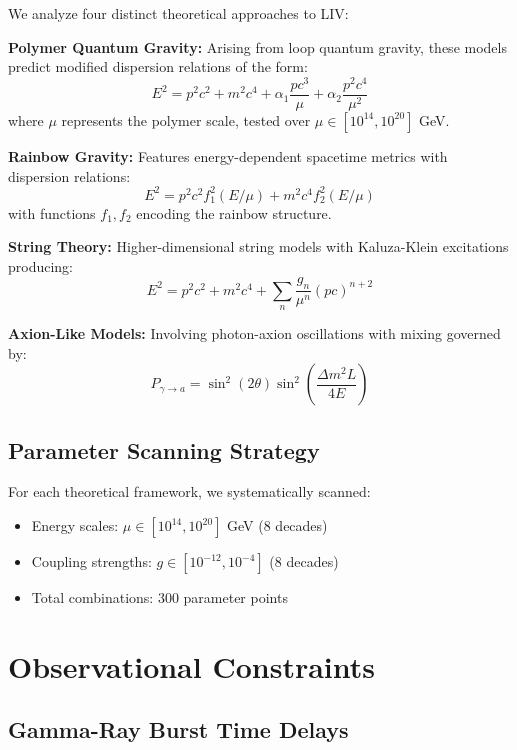 \documentclass[12pt]{article}
\begin{document}
We analyze four distinct theoretical approaches to LIV:

\textbf{Polymer Quantum Gravity:} 
Arising from loop quantum gravity, these models predict modified dispersion relations of the form:
\begin{equation}
E^2 = p^2c^2 + m^2c^4 + \alpha_1 \frac{pc^3}{\mu} + \alpha_2 \frac{p^2c^4}{\mu^2}
\end{equation}
where $\mu$ represents the polymer scale, tested over $\mu \in [10^{14}, 10^{20}]$ GeV.

\textbf{Rainbow Gravity:} 
Features energy-dependent spacetime metrics with dispersion relations:
\begin{equation}
E^2 = p^2c^2f_1^2(E/\mu) + m^2c^4f_2^2(E/\mu)
\end{equation}
with functions $f_1, f_2$ encoding the rainbow structure.

\textbf{String Theory:} 
Higher-dimensional string models with Kaluza-Klein excitations producing:
\begin{equation}
E^2 = p^2c^2 + m^2c^4 + \sum_n \frac{g_n}{\mu^n}(pc)^{n+2}
\end{equation}

\textbf{Axion-Like Models:} 
Involving photon-axion oscillations with mixing governed by:
\begin{equation}
P_{\gamma \to a} = \sin^2(2\theta)\sin^2\left(\frac{\Delta m^2 L}{4E}\right)
\end{equation}

\subsection{Parameter Scanning Strategy}

For each theoretical framework, we systematically scanned:
\begin{itemize}
\item Energy scales: $\mu \in [10^{14}, 10^{20}]$ GeV (8 decades)
\item Coupling strengths: $g \in [10^{-12}, 10^{-4}]$ (8 decades) 
\item Total combinations: 300 parameter points
\end{itemize}

\section{Observational Constraints}

\subsection{Gamma-Ray Burst Time Delays}
\end{document}

